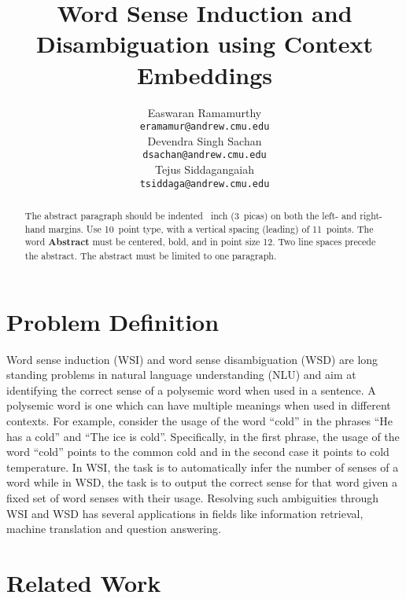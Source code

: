 \documentclass{article}
\title{Word Sense Induction and Disambiguation using Context Embeddings}
\author{
  Easwaran Ramamurthy \\
  \texttt{eramamur@andrew.cmu.edu} \\
   \And
  Devendra Singh Sachan \\
  \texttt{dsachan@andrew.cmu.edu} \\
  \AND
  Tejus Siddagangaiah \\
  \texttt{tsiddaga@andrew.cmu.edu} \\
}
\begin{document}

\maketitle

\begin{abstract}
  The abstract paragraph should be indented ~inch
  (3~picas) on both the left- and right-hand margins. Use 10~point
  type, with a vertical spacing (leading) of 11~points.  The word
  \textbf{Abstract} must be centered, bold, and in point size 12. Two
  line spaces precede the abstract. The abstract must be limited to
  one paragraph.
\end{abstract}

\section{Problem Definition}

Word sense induction (WSI) and word sense disambiguation (WSD) are long standing problems in natural language understanding (NLU) and aim at identifying the correct sense of a polysemic word when used in a sentence. A polysemic word is one which can have multiple meanings when used in different contexts. For example, consider the usage of the word “cold” in the phrases “He has a cold” and “The ice is cold”. Specifically, in the first phrase, the usage of the word “cold” points to the common cold and in the second case it points to cold temperature. In WSI, the task is to automatically infer the number of senses of a word while in WSD, the task is to output the correct sense for that word given a fixed set of word senses with their usage. Resolving such ambiguities through WSI and WSD has several applications in fields like information retrieval, machine translation and question answering.

\section{Related Work}
\end{document}
